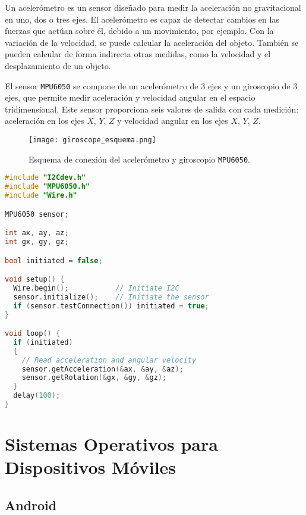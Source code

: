 \begin{enumerate}
Un acelerómetro es un sensor diseñado para medir la aceleración no gravitacional en uno, dos o tres ejes. El acelerómetro es capaz de detectar cambios en las fuerzas que actúan sobre él, debido a un movimiento, por ejemplo. Con la variación de la velocidad, se puede calcular la aceleración del objeto. También se pueden calcular de forma indirecta otras medidas, como la velocidad y el desplazamiento de un objeto.

El sensor \texttt{MPU6050} se compone de un acelerómetro de 3 ejes y un giroscopio de 3 ejes, que permite medir aceleración y velocidad angular en el espacio tridimensional. Este sensor proporciona seis valores de salida con cada medición: aceleración en los ejes $X$, $Y$, $Z$ y velocidad angular en los ejes $X$, $Y$, $Z$.

\begin{figure}[!h]
\begin{center}
\texttt{[image: giroscope\_esquema.png]}
\caption{Esquema de conexión del acelerómetro y giroscopio \texttt{MPU6050}.}
\label{fig:mpu6050}
\end{center}
\end{figure}
\end{enumerate}

\begin{lstlisting}[language=c++,captionpos=t,caption={\textbf{Utilización básica del acelerómetro y giroscopio MPU6050.}},label={lst:basicMPU6050}]
#include "I2Cdev.h"
#include "MPU6050.h"
#include "Wire.h"

MPU6050 sensor;

int ax, ay, az;
int gx, gy, gz;

bool initiated = false;

void setup() {
  Wire.begin();           // Initiate I2C  
  sensor.initialize();    // Initiate the sensor
  if (sensor.testConnection()) initiated = true;
}

void loop() {
  if (initiated)
  {
    // Read acceleration and angular velocity
    sensor.getAcceleration(&ax, &ay, &az);
    sensor.getRotation(&gx, &gy, &gz);
  }
  delay(100);
}
\end{lstlisting}

\section{Sistemas Operativos para Dispositivos Móviles}
\subsection{Android}

